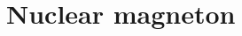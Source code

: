 \hypertarget{group___nuclear_magneton}{}\section{Nuclear magneton}
\label{group___nuclear_magneton}
